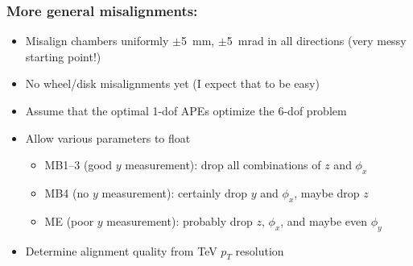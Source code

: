 \documentclass[compress]{beamer}
\begin{document}
\begin{frame}
\frametitle{More general misalignments:}
\begin{itemize}\setlength{\itemsep}{0.25 cm}
\item Misalign chambers uniformly $\pm$5~mm, $\pm$5~mrad in all directions (very messy starting point!)
\item No wheel/disk misalignments yet (I expect that to be easy)
\item Assume that the optimal 1-dof APEs optimize the 6-dof problem
\item Allow various parameters to float
\begin{itemize}
\item MB1--3 (good $y$ measurement): drop all combinations of $z$ and $\phi_x$
\item MB4 (no $y$ measurement): certainly drop $y$ and $\phi_x$, maybe drop $z$
\item ME (poor $y$ measurement): probably drop $z$, $\phi_x$, and maybe even $\phi_y$
\end{itemize}
\item Determine alignment quality from TeV $p_T$ resolution
\end{itemize}

\end{frame}
\end{document}
